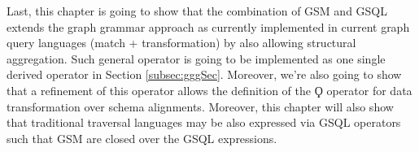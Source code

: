Last, this chapter is going to show that the combination of GSM and GSQL extends the graph grammar approach as currently implemented in current graph query languages (match + transformation) by also allowing structural aggregation. Such general operator is going to be implemented as one single derived operator in Section \ref{subsec:gggSec}. Moreover, we're also going to show that a refinement of this operator allows the definition of the $\Qoppa$ operator for data transformation over schema alignments.
Moreover, this chapter will also show that traditional traversal languages may be also  expressed via GSQL operators such that GSM are closed over the GSQL expressions. 
